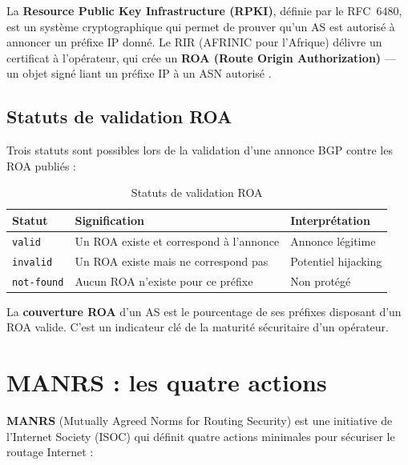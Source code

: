 \documentclass{eneam}
\begin{document}
La \textbf{Resource Public Key Infrastructure (RPKI)}, définie par le RFC~6480, est un système cryptographique qui permet de prouver qu'un AS est autorisé à annoncer un préfixe IP donné. Le RIR (AFRINIC pour l'Afrique) délivre un certificat à l'opérateur, qui crée un \textbf{ROA (Route Origin Authorization)} --- un objet signé liant un préfixe IP à un ASN autorisé \cite{RFC6811}.

\subsection{Statuts de validation ROA}

Trois statuts sont possibles lors de la validation d'une annonce BGP contre les ROA publiés :

\begin{table}[H]
\caption{Statuts de validation ROA}
\centering
\begin{tabular}{|l|l|l|}
\hline
\textbf{Statut} & \textbf{Signification} & \textbf{Interprétation} \\
\hline
\texttt{valid} & Un ROA existe et correspond à l'annonce & Annonce légitime \\
\hline
\texttt{invalid} & Un ROA existe mais ne correspond pas & Potentiel hijacking \\
\hline
\texttt{not-found} & Aucun ROA n'existe pour ce préfixe & Non protégé \\
\hline
\end{tabular}
\end{table}

La \textbf{couverture ROA} d'un AS est le pourcentage de ses préfixes disposant d'un ROA valide. C'est un indicateur clé de la maturité sécuritaire d'un opérateur.

\section{MANRS : les quatre actions}

\textbf{MANRS} (Mutually Agreed Norms for Routing Security) est une initiative de l'Internet Society (ISOC) qui définit quatre actions minimales pour sécuriser le routage Internet \cite{MANRS2025} :
\end{document}
